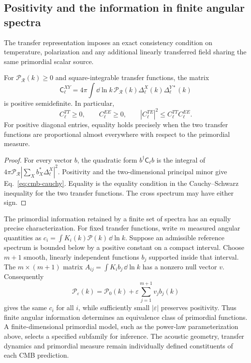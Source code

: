 \subsection{Positivity and the information in finite angular spectra}
\label{sec:cmb-positive}
The transfer representation imposes an exact consistency condition on temperature, polarization and any additional linearly transferred field sharing the same primordial scalar source.
\begin{proposition}\label{prop:cmb-positive}
For $\mathcal P_{\mathcal R}(k)\geq0$ and square-integrable transfer functions, the matrix
\[
\mathsf C_\ell^{XY}=4\pi\int\dd\ln k\,
\mathcal P_{\mathcal R}(k)\Delta_\ell^X(k)\Delta_\ell^{Y*}(k)
\]
is positive semidefinite. In particular,
\begin{equation}\label{eq:cmb-cauchy}
C_\ell^{TT}\geq0,\qquad C_\ell^{EE}\geq0,\qquad
|C_\ell^{TE}|^2\leq C_\ell^{TT}C_\ell^{EE}.
\end{equation}
For positive diagonal entries, equality holds precisely when the two transfer functions are proportional almost everywhere with respect to the primordial measure.
\end{proposition}
\begin{proof}
For every vector $b$, the quadratic form $b^\dagger\mathsf C_\ell b$ is the integral of $4\pi\mathcal P_{\mathcal R}|\sum_Xb_X^*\Delta_\ell^X|^2$. Positivity and the two-dimensional principal minor give Eq.~\eqref{eq:cmb-cauchy}. Equality is the equality condition in the Cauchy--Schwarz inequality for the two transfer functions. The cross spectrum may have either sign.
\end{proof}

The primordial information retained by a finite set of spectra has an equally precise characterization. For fixed transfer functions, write $m$ measured angular quantities as $c_i=\int K_i(k)\mathcal P(k)\,\dd\ln k$. Suppose an admissible reference spectrum is bounded below by a positive constant on a compact interval. Choose $m+1$ smooth, linearly independent functions $b_j$ supported inside that interval. The $m\times(m+1)$ matrix $A_{ij}=\int K_i b_j\,\dd\ln k$ has a nonzero null vector $v$. Consequently
\begin{equation}\label{eq:primordial-null-family}
\mathcal P_\varepsilon(k)=\mathcal P_0(k)+\varepsilon\sum_{j=1}^{m+1}v_jb_j(k)
\end{equation}
gives the same $c_i$ for all $i$, while sufficiently small $|\varepsilon|$ preserves positivity. Thus finite angular information determines an equivalence class of primordial functions. A finite-dimensional primordial model, such as the power-law parameterization above, selects a specified subfamily for inference. The acoustic geometry, transfer dynamics and primordial measure remain individually defined constituents of each CMB prediction.
